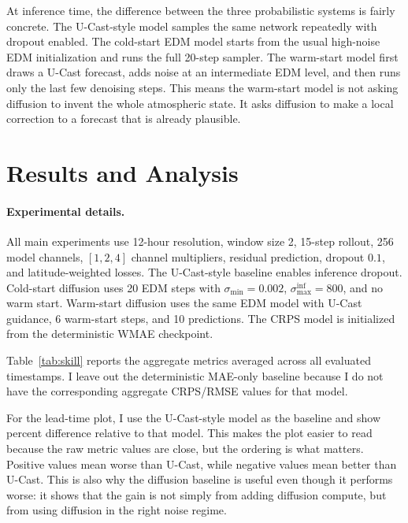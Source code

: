 \documentclass{article}
\begin{document}
At inference time, the difference between the three probabilistic systems is fairly concrete. The U-Cast-style model samples the same network repeatedly with dropout enabled. The cold-start EDM model starts from the usual high-noise EDM initialization and runs the full 20-step sampler. The warm-start model first draws a U-Cast forecast, adds noise at an intermediate EDM level, and then runs only the last few denoising steps. This means the warm-start model is not asking diffusion to invent the whole atmospheric state. It asks diffusion to make a local correction to a forecast that is already plausible.

\section{Results and Analysis}

\paragraph{Experimental details.}
All main experiments use 12-hour resolution, window size 2, 15-step rollout, 256 model channels, $[1,2,4]$ channel multipliers, residual prediction, dropout $0.1$, and latitude-weighted losses. The U-Cast-style baseline enables inference dropout. Cold-start diffusion uses 20 EDM steps with $\sigma_{\min}=0.002$, $\sigma_{\max}^{\mathrm{inf}}=800$, and no warm start. Warm-start diffusion uses the same EDM model with U-Cast guidance, 6 warm-start steps, and 10 predictions. The CRPS model is initialized from the deterministic WMAE checkpoint.

Table~\ref{tab:skill} reports the aggregate metrics averaged across all evaluated timestamps. I leave out the deterministic MAE-only baseline because I do not have the corresponding aggregate CRPS/RMSE values for that model.

For the lead-time plot, I use the U-Cast-style model as the baseline and show percent difference relative to that model. This makes the plot easier to read because the raw metric values are close, but the ordering is what matters. Positive values mean worse than U-Cast, while negative values mean better than U-Cast. This is also why the diffusion baseline is useful even though it performs worse: it shows that the gain is not simply from adding diffusion compute, but from using diffusion in the right noise regime.
\end{document}
